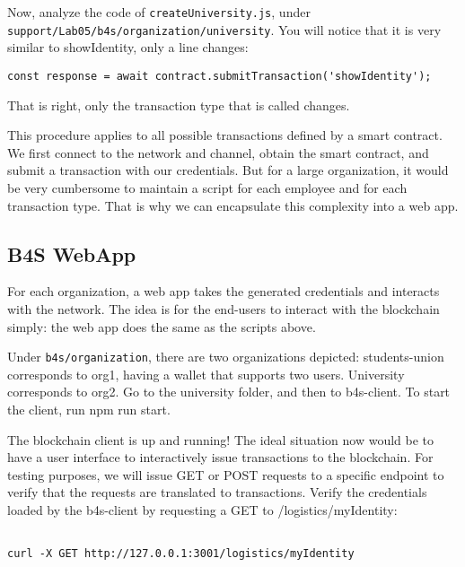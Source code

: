 \documentclass[12pt,a4paper]{article}
\theoremstyle{definition}
\begin{document}
Now, analyze the code of \texttt{createUniversity.js}, under \texttt{support/Lab05/b4s/organization/university}. You will notice that it is very similar to showIdentity, only a line changes:
\begin{verbatim}
const response = await contract.submitTransaction('showIdentity');
\end{verbatim}

That is right, only the transaction type that is called changes.


This procedure applies to all possible transactions defined by a smart contract. We first connect to the network and channel, obtain the smart contract, and submit a transaction with our credentials. But for a large organization, it would be very cumbersome to maintain a script for each employee and for each transaction type. That is why we can encapsulate this complexity into a web app.



\subsection{B4S WebApp}
For each organization, a web app takes the generated credentials and interacts with the network. The idea is for the end-users to interact with the blockchain simply: the web app does the same as the scripts above.

Under \texttt{b4s/organization}, there are two organizations depicted: students-union corresponds to org1, having a wallet that supports two users. University corresponds to org2. Go to the university folder, and then to b4s-client. To start the client, run npm run start.

The blockchain client is up and running! The ideal situation now would be to have a user interface to interactively issue transactions to the blockchain. For testing purposes, we will issue GET or POST requests to a specific endpoint to verify that the requests are translated to transactions. Verify the credentials loaded by the b4s-client by requesting a GET to /logistics/myIdentity:
\begin{verbatim}

curl -X GET http://127.0.0.1:3001/logistics/myIdentity
\end{verbatim}
\end{document}
